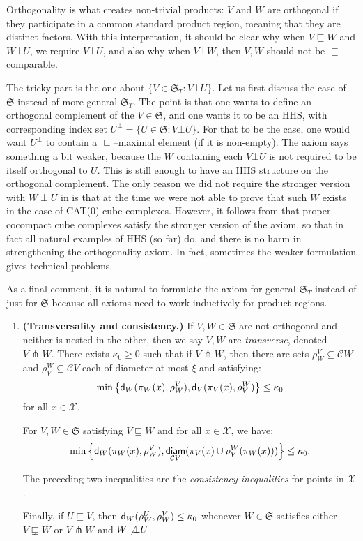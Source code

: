 \documentclass[11pt,oneside]{amsart}
\newcounter{ax}
\theoremstyle{definition}
\DeclareMathOperator{\diam}{\textup{\textsf{diam}}}
\newcommand{\dist}{\textup{\textsf{d}}}
\newcommand{\cuco}[1]{{\mathcal #1}}
\newcommand{\fontact}{{\mathcal C}}
\newcommand{\nest}{\sqsubseteq}
\newcommand{\propnest}{\sqsubsetneq}
\newcommand{\orth}{\bot}
\newcommand{\transverse}{\pitchfork}
\begin{document}
 \par\bigskip
 
 Orthogonality is what creates non-trivial products: $V$ and $W$ are orthogonal if they participate in a common standard product region, meaning that they are distinct factors. With this interpretation, it should be clear why when $V\nest W$ and $W\orth U$, we require $V\orth U$, and also why when $V\orth W$, then $V,W$ should not be $\nest$--comparable.
 
 The tricky part is the one about $\{V\in\mathfrak S_T:V\orth U\}$. Let us first discuss the case of $\mathfrak S$ instead of more general $\mathfrak S_T$. The point is that one wants to define an orthogonal complement of the $V\in\mathfrak S$, and one wants it to be an HHS, with corresponding index set $U^\perp=\{U\in\mathfrak S:V\orth U\}$. For that to be the case, one would want $U^\perp$ to contain a $\nest$--maximal element (if it is non-empty). The axiom says something a bit weaker, because the $W$ containing each $V\orth U$ is not required to be itself orthogonal to $U$. This is still enough to have an HHS structure on the orthogonal complement. The only reason we did not require the stronger version with $W\perp U$ in \cite{HHS1} is that at the time we were not able to prove that such $W$ exists in the case of CAT(0) cube complexes. However, it follows from \cite[Theorem 3.5]{HagenSusse} that proper cocompact cube complexes satisfy the stronger version of the axiom, so that in fact all natural examples of HHS (so far) do, and there is no harm in strengthening the orthogonality axiom. In fact, sometimes the weaker formulation gives technical problems.
 
 As a final comment, it is natural to formulate the axiom for general $\mathfrak S_T$ instead of just for $\mathfrak S$ because all axioms need to work inductively for product regions.
 
\par\bigskip
 
 {\it \begin{enumerate}[(4)]
 \item \textbf{(Transversality and consistency.)}
 \label{item:dfs_transversal} If $V,W\in\mathfrak S$ are not
 orthogonal and neither is nested in the other, then we say $V,W$ are
 \emph{transverse}, denoted $V\transverse W$.  There exists
 $\kappa_0\geq 0$ such that if $V\transverse W$, then there are
  sets $\rho^V_W\subseteq\fontact W$ and
 $\rho^W_V\subseteq\fontact V$ each of diameter at most $\xi$ and 
 satisfying: $$\min\left\{\dist_{
 W}(\pi_W(x),\rho^V_W),\dist_{
 V}(\pi_V(x),\rho^W_V)\right\}\leq\kappa_0$$ for all $x\in\cuco X$.
 
 For $V,W\in\mathfrak S$ satisfying $V\nest W$ and for all
 $x\in\cuco X$, we have: $$\min\left\{\dist_{
 W}(\pi_W(x),\rho^V_W),\diam_{\fontact
 V}(\pi_V(x)\cup\rho^W_V(\pi_W(x)))\right\}\leq\kappa_0.$$ 
 
 The preceding two inequalities are the \emph{consistency inequalities} for points in $\cuco X$.
 
 Finally, if $U\nest V$, then $\dist_W(\rho^U_W,\rho^V_W)\leq\kappa_0$ whenever $W\in\mathfrak S$ satisfies either $V\propnest W$ or $V\transverse W$ and $W\not\orth U$.
 \end{enumerate}}
 
\end{document}
